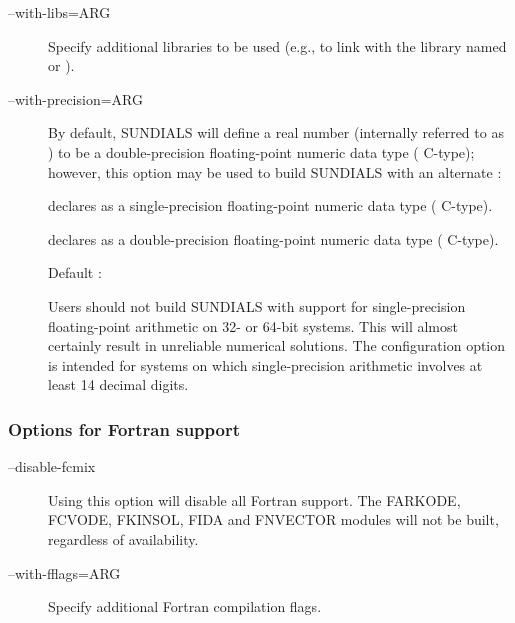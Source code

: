 \documentclass[letterpaper,10pt,english]{sphinxmanual}
\begin{document}
\begin{description}
\item[{--with-libs=ARG}] \leavevmode
Specify additional libraries to be used (e.g.,
 to link with the library named 
or ).

\item[{--with-precision=ARG}] \leavevmode
By default, SUNDIALS will define a real number
(internally referred to as ) to be a double-precision
floating-point numeric data type ( C-type); however, this
option may be used to build SUNDIALS with an alternate
:

 declares  as a
single-precision floating-point numeric data type (
C-type).

 declares  as a
double-precision floating-point numeric data type (
C-type).

Default :

Users should not build SUNDIALS with support for single-precision
floating-point arithmetic on 32- or 64-bit systems.  This will
almost certainly result in unreliable numerical solutions. The
configuration option  is intended for
systems on which single-precision arithmetic involves at least 14
decimal digits.

\end{description}


\subsubsection{Options for Fortran support}
\label{Install:options-for-fortran-support}\begin{description}
\item[{--disable-fcmix}] \leavevmode
Using this option will disable all Fortran
support. The FARKODE, FCVODE, FKINSOL, FIDA and FNVECTOR modules
will not be built, regardless of availability.

\item[{--with-fflags=ARG}] \leavevmode
Specify additional Fortran compilation flags.

\end{description}
\end{document}
